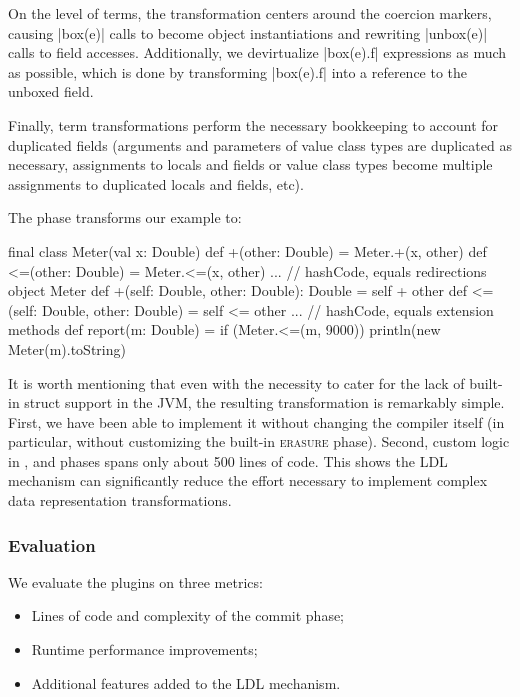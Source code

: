 On the level of terms, the transformation centers around the coercion markers, causing |box(e)| calls to become object instantiations and rewriting |unbox(e)| calls to field accesses. Additionally, we devirtualize |box(e).f| expressions as much as possible, which is done by transforming |box(e).f| into a reference to the unboxed field.

Finally, term transformations perform the necessary bookkeeping to account for duplicated fields (arguments and parameters of value class types are duplicated as necessary, assignments to locals and fields or value class types become multiple assignments to duplicated locals and fields, etc).

The \commit{} phase transforms our example to:

\begin{lstlisting-nobreak}
 final class Meter(val x: Double) {
   def +(other: Double) = Meter.+(x, other)
   def <=(other: Double) = Meter.<=(x, other)
   ... // hashCode, equals redirections
 }
 object Meter {
   def +(self: Double, other: Double): Double = self + other
   def <=(self: Double, other: Double) = self <= other
   ... // hashCode, equals extension methods
 }
 def report(m: Double) = {
   if (Meter.<=(m, 9000))
     println(new Meter(m).toString)
 }
\end{lstlisting-nobreak}

It is worth mentioning that even with the necessity to cater for the lack of built-in struct support in the JVM, the resulting transformation is remarkably simple. First, we have been able to implement it without changing the compiler itself (in particular, without customizing the built-in \textsc{erasure} phase). Second, custom logic in \inject{}, \coerce{} and \commit{} phases spans only about 500 lines of code. This shows the LDL mechanism can significantly reduce the effort necessary to implement complex data representation transformations.

\subsubsection{Evaluation}

We evaluate the plugins on three metrics:
\begin{itemize}
\item Lines of code and complexity of the commit phase;
\item Runtime performance improvements;
\item Additional features added to the LDL mechanism.
\end{itemize}

